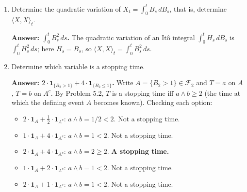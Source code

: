 \documentclass[11pt]{article}
\newcommand{\ans}[1]{\par\noindent\textbf{\color{blue!50!black}Answer: #1}}
\begin{document}
\begin{enumerate}
\item[\textbf{Q9.}] Determine the quadratic variation of $X_t=\int_0^tB_s\,dB_s$, that is, determine $\langle X,X\rangle_t$.

\ans{$\displaystyle\int_0^tB_s^2\,ds$.} The quadratic variation of an Itô integral $\int_0^tH_s\,dB_s$ is $\int_0^tH_s^2\,ds$; here $H_s=B_s$, so $\langle X,X\rangle_t=\int_0^tB_s^2\,ds$.

\item[\textbf{Q10.}] Determine which variable is a stopping time.

\ans{$2\cdot\mathbf1_{\{B_2>1\}}+4\cdot\mathbf1_{\{B_2\le1\}}$.} Write $A=\{B_2>1\}\in\mathcal F_2$ and $T=a$ on $A$, $T=b$ on $A^c$. By Problem 5.2, $T$ is a stopping time iff $a\wedge b\ge2$ (the time at which the defining event $A$ becomes known). Checking each option:
\begin{itemize}[nosep]
\item $2\cdot\mathbf1_A+\tfrac12\cdot\mathbf1_{A^c}$: $a\wedge b=1/2<2$. Not a stopping time.
\item $1\cdot\mathbf1_A+4\cdot\mathbf1_{A^c}$: $a\wedge b=1<2$. Not a stopping time.
\item $2\cdot\mathbf1_A+4\cdot\mathbf1_{A^c}$: $a\wedge b=2\ge2$. \textbf{A stopping time.}
\item $1\cdot\mathbf1_A+2\cdot\mathbf1_{A^c}$: $a\wedge b=1<2$. Not a stopping time.
\item $2\cdot\mathbf1_A+1\cdot\mathbf1_{A^c}$: $a\wedge b=1<2$. Not a stopping time.
\end{itemize}

\end{enumerate}
\end{document}
